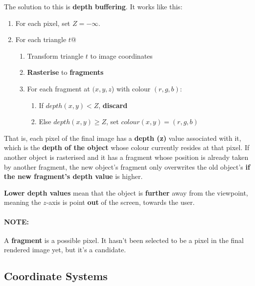 \documentclass{article}
\begin{document}
The solution to this is \textbf{depth buffering}. It works like this:
\begin{enumerate}
	\item For each pixel, set $Z = -\infty$. 
	\item For each triangle $t$@
	\begin{enumerate}
		\item Transform triangle $t$ to image coordinates\\
		\item \textbf{Rasterise} to \textbf{fragments}
		\item For each fragment  at $(x, y, z$) with colour $(r, g, b)$:
		\begin{enumerate}
			\item If $depth(x, y) < Z$, \textbf{discard}
			\item Else $depth(x, y) \geq Z$, set $colour(x, y) = (r, g, b)$
		\end{enumerate}
	\end{enumerate}
\end{enumerate}
That is, each pixel of the final image has a \textbf{depth (z)} value associated with it, which is the \textbf{depth of the object} whose colour currently resides at that pixel. If another object is rasterised and it has a fragment whose position is already taken by another fragment, the new object's fragment only overwrites the old object's \textbf{if the new fragment's depth value} is higher.

\textbf{Lower depth values} mean that the object is \textbf{further} away from the viewpoint, meaning the $z$-axis is point \textbf{out} of the screen, towards the user.

\paragraph{\textbf{NOTE: }} A \textbf{fragment} is a possible pixel. It hasn't been selected to be a pixel in the final rendered image yet, but it's a candidate.

\subsection{Coordinate Systems}
\end{document}
